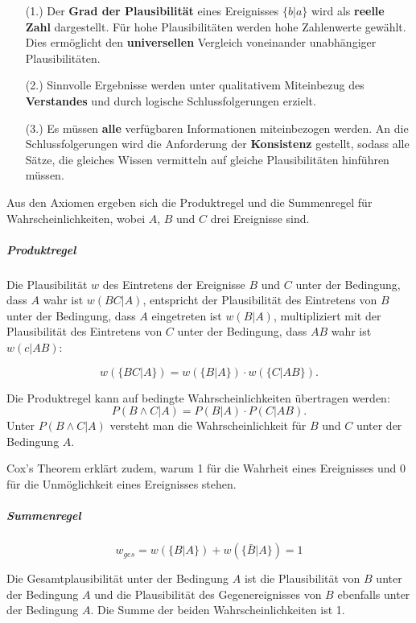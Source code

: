 \documentclass[]{dsadokumentation}
\begin{document}
{
\begin{itemize}
 \item[(1.)] Der \textbf{Grad der Plausibilität} eines Ereignisses $\{b|a\}$ wird als \textbf {reelle Zahl} dargestellt. Für hohe Plausibilitäten werden hohe Zahlenwerte gewählt. Dies ermöglicht den \textbf {universellen} Vergleich voneinander unabhängiger Plausibilitäten.

 \item[(2.)] Sinnvolle Ergebnisse werden unter qualitativem Miteinbezug des \textbf {Verstandes} und durch logische Schlussfolgerungen erzielt.
 \item[(3.)] Es müssen \textbf {alle }verfügbaren Informationen miteinbezogen werden. An die Schlussfolgerungen wird die Anforderung der \textbf {Konsistenz }gestellt, sodass alle Sätze, die gleiches Wissen vermitteln auf gleiche Plausibilitäten hinführen müssen.
\end{itemize}
}
Aus den Axiomen ergeben sich die Produktregel und die Summenregel für Wahrscheinlichkeiten, wobei $A$, $B$ und $C$ drei Ereignisse sind.

\subparagraph{Produktregel}

Die Plausibilität $w$ des Eintretens der Ereignisse $B$ und $C$ unter der Bedingung, dass $A$ wahr ist $w(BC|A)$,
entspricht der Plausibilität des Eintretens von $B$ unter der Bedingung, dass $A$ eingetreten ist $w(B|A)$,
multipliziert mit der Plausibilität des Eintretens von $C$ unter der Bedingung, dass $AB$ wahr ist $w(c|AB)$:

\begin {equation}
w(\{BC|A\})=w(\{B|A\})\cdot w(\{C|AB\}) .
\end{equation}

\noindent Die Produktregel kann auf bedingte Wahrscheinlichkeiten übertragen werden:
\begin {equation}
P(B \wedge C|A) = P(B|A)\cdot P(C|AB).
\end{equation}
Unter $P(B \wedge C|A)$ versteht man die Wahrscheinlichkeit für $B$ und $C$ unter der Bedingung $A$.

Cox's Theorem erklärt zudem, warum 1 für die Wahrheit eines Ereignisses und 0 für die Unmöglichkeit eines Ereignisses stehen.

\subparagraph{Summenregel}
\begin{equation}
w_{ges}=w(\{B|A\}) + w(\{\bar{B}|A\})= 1
\end{equation}

Die Gesamtplausibilität unter der Bedingung $A$ ist die Plausibilität von $B$ unter der Bedingung $A$
und die Plausibilität des Gegenereignisses von $B$ ebenfalls unter der Bedingung $A$. Die Summe der beiden Wahrscheinlichkeiten ist 1.
\end{document}
